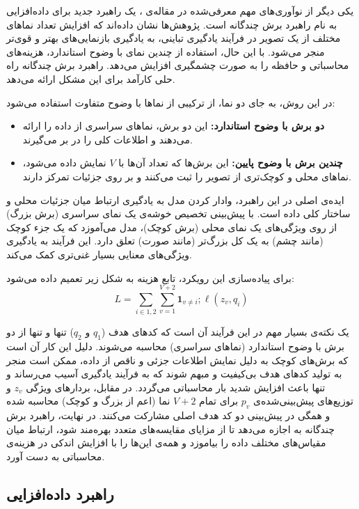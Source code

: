 یکی دیگر از نوآوری‌های مهم معرفی‌شده در مقاله‌ی ، یک راهبرد جدید برای داده‌افزایی به نام راهبرد برش چندگانه است.
پژوهش‌ها نشان داده‌اند که افزایش تعداد نماهای مختلف از یک تصویر در فرآیند یادگیری تباینی، به یادگیری بازنمایی‌های بهتر و قوی‌تر منجر می‌شود. با این حال، استفاده از چندین نمای با وضوح
استاندارد، هزینه‌های محاسباتی و حافظه را به صورت چشمگیری افزایش می‌دهد. راهبرد برش چندگانه راه حلی کارآمد برای این مشکل ارائه می‌دهد.

در این روش، به جای دو نما، از ترکیبی از نماها با وضوح متفاوت استفاده می‌شود:
\begin{itemize}
\item \textbf{دو برش با وضوح استاندارد:} این دو برش، نماهای سراسری از داده را ارائه می‌دهند و اطلاعات کلی را در بر می‌گیرند.
\item \textbf{چندین برش با وضوح پایین:} این برش‌ها که تعداد آن‌ها با 
$V$
نمایش داده می‌شود، نماهای محلی و کوچک‌تری از تصویر را ثبت می‌کنند و بر روی جزئیات تمرکز دارند.
\end{itemize}
ایده‌ی اصلی در این راهبرد، وادار کردن مدل به یادگیری ارتباط میان جزئیات محلی و ساختار کلی داده است. با پیش‌بینی تخصیص خوشه‌ی یک نمای سراسری (برش بزرگ) از روی ویژگی‌های یک نمای محلی (برش کوچک)، مدل می‌آموزد که یک جزء کوچک (مانند چشم) به یک کل بزرگ‌تر (مانند صورت) تعلق دارد. این فرآیند به یادگیری ویژگی‌های معنایی بسیار غنی‌تری کمک می‌کند.

برای پیاده‌سازی این رویکرد، تابع هزینه به شکل زیر تعمیم داده می‌شود:
\begin{equation}
L = \sum_{i \in {1, 2}} \sum_{v=1}^{V+2} \mathbf{1}_{v \neq i} ; \ell(z_v, q_i)
\label{eq:multicrop_loss}
\end{equation}

یک نکته‌ی بسیار مهم در این فرآیند آن است که کدهای هدف
($q_1$ و $q_2$)
تنها و تنها از دو برش با وضوح استاندارد (نماهای سراسری) محاسبه می‌شوند. دلیل این کار آن است که برش‌های کوچک به دلیل نمایش اطلاعات جزئی و ناقص از داده، ممکن است منجر به تولید کدهای هدف بی‌کیفیت و مبهم شوند که به فرآیند یادگیری آسیب می‌رساند و تنها باعث افزایش شدید بار محاسباتی می‌گردد. در مقابل، بردارهای ویژگی
$z_v$
و توزیع‌های پیش‌بینی‌شده‌ی
$p_v$
برای تمام
$V+2$
نما (اعم از بزرگ و کوچک) محاسبه شده و همگی در پیش‌بینی دو کد هدف اصلی مشارکت می‌کنند. در نهایت، راهبرد برش چندگانه به  اجازه می‌دهد تا از مزایای مقایسه‌های متعدد بهره‌مند شود، ارتباط میان مقیاس‌های مختلف داده را بیاموزد و همه‌ی این‌ها را با افزایش اندکی در هزینه‌ی محاسباتی به دست آورد.

\subsection{راهبرد داده‌افزایی}

